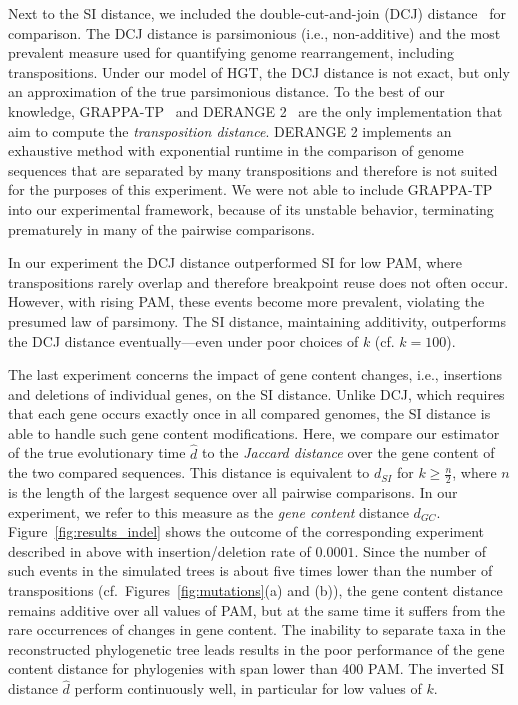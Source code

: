 \documentclass[9pt,english,utf8]{article}
\begin{document}
Next to the SI distance, we included the double-cut-and-join (DCJ)
distance~\cite{Yancopoulos:2005bm,Bergeron:2006uj} for comparison. The DCJ
distance is parsimonious (i.e., non-additive) and the most prevalent measure
used for quantifying genome rearrangement, including transpositions. Under our
model of HGT, the DCJ distance is not exact, but only an approximation of the
true parsimonious distance. To the best of our knowledge,
GRAPPA-TP~\cite{Yue:2008ima} and DERANGE 2~\cite{Blanchette:1996wx} are the
only implementation that aim to compute the \emph{transposition distance}.
DERANGE 2 implements an exhaustive method with exponential runtime in the
comparison of genome sequences that are separated by many transpositions and
therefore is not suited for the purposes of this experiment. We were not able
to include GRAPPA-TP into our experimental framework, because of its unstable
behavior, terminating prematurely in many of the pairwise comparisons.

In our experiment the DCJ distance outperformed SI for low PAM, where
transpositions rarely overlap and therefore breakpoint reuse does not often
occur. However, with rising PAM, these events become more prevalent, violating
the presumed law of parsimony.  The SI distance, maintaining additivity,
outperforms the DCJ distance eventually---even under poor choices of $k$ (cf.
$k=100$).

\medskip
The last experiment concerns the impact of gene content changes, i.e.,
insertions and deletions of individual genes, on the SI distance. Unlike DCJ,
which requires that each gene occurs exactly once in all compared genomes,
the SI distance is able to handle such gene content modifications.  Here, we
compare our estimator of the true evolutionary time $\hat d$ to the
\emph{Jaccard distance} over the gene content of the two compared sequences.
This distance is equivalent to $d_{SI}$ for $k \geq \frac{n}{2}$, where $n$ is
the length of the largest sequence over all pairwise comparisons. In our
experiment, we refer to this measure as the \emph{gene content} distance
$d_{GC}$. Figure~\ref{fig:results_indel} shows the outcome of the corresponding
experiment described in above with insertion/deletion rate of $0.0001$. Since
the number of such events in the simulated trees is about five times lower than
the number of transpositions (cf.~Figures~\ref{fig:mutations}(a) and (b)), the
gene content distance remains additive over all values of PAM, but at the same
time it suffers from the rare occurrences of changes in gene content. The
inability to separate taxa in the reconstructed phylogenetic tree leads results
in the poor performance of the gene content distance for phylogenies with span
lower than 400 PAM. The inverted SI distance $\hat d$ perform continuously
well, in particular for low values of $k$. 
\end{document}
